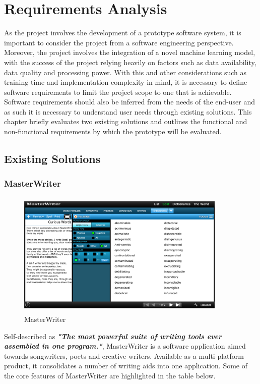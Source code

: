 \chapter{Requirements Analysis}
\label{chap:requirements_analysis}
As the project involves the development of a prototype software system, it is important to consider the project from a software engineering perspective. Moreover, the project involves the integration of a novel machine learning model, with the success of the project relying heavily on factors such as data availability, data quality and processing power. With this and other considerations such as training time and implementation complexity in mind, it is necessary to define software requirements to limit the project scope to one that is achievable. Software requirements should also be inferred from the needs of the end-user and as such it is necessary to understand user needs through existing solutions. This chapter briefly evaluates two existing solutions and outlines the functional and non-functional requirements by which the prototype will be evaluated.
\section{Existing Solutions}
\subsection{MasterWriter}
\begin{figure}[h]
	\includegraphics[width=10cm, height=6cm]{./figures/fig9}
	\centering
	\caption{MasterWriter}
	\label{fig:fig9}
\end{figure}
\noindent
Self-described as \textbf{\textit{"The most powerful suite of writing tools ever assembled in one program."}}, MasterWriter is a software application aimed towards songwriters, poets and creative
writers. Available as a multi-platform product, it consolidates a number of writing aids into one application. Some of the core features of MasterWriter are highlighted in the table below.

